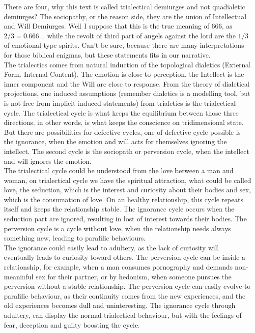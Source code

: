 \documentclass[12pt,a4paper]{article}
\begin{document}
There are four, why this text is called trialectical demiurges and not quadialetic demiurges? The sociopathy, or the reason side, they are the union of Intellectual and Will Demiurges. Well I suppose that this is the true meaning of $666$, as $2/3=0.666\dots$ while the revolt of third part of angels against the lord are the $1/3$ of emotional type spirits. Can't be sure, because there are many interpretations for those biblical enigmas, but these statements fits in our narrative.\\

The trialectics comes from natural induction of the topological dialetics (External Form, Internal Content). The emotion is close to perception, the Intellect is the inner component and the Will are close to response. From the theory of dialetical projections, one induced assumptions (remember dialetics is a modelling tool, but is not free from implicit induced statements) from trialetics is the trialectical cycle. The trialectical cycle is what keeps the equilibrium between those three directions, in other words, is what keeps the conscience on tridimensional state. But there are possibilities for defective cycles, one of defective cycle possible is the ignorance, when the emotion and will acts for themselves ignoring the intellect. The second cycle is the sociopath or perversion cycle, when the intellect and will ignores the emotion. \\

The trialectical cycle could be understood from the love between a man and woman, on trialectical cycle we have the spiritual attraction, what could be called love, the seduction, which is the interest and curiosity about their bodies and sex, which is the consumation of love. On an healthy relationship, this cycle repeats itself and keeps the relationship stable. The ignorance cycle occurs when the seduction part are ignored, resulting in lost of interest towards their bodies. The perversion cycle is a cycle without love, when the relationship needs always something new, leading to parafilic behaviours. \\

The ignorance could easily lead to adultery, as the lack of curiosity will eventually leads to curiosity toward others. The perversion cycle can be inside a relationship, for example, when a man consumes pornography and demands non-meaninful sex for their partner, or by hedonism, when someone pursues the perversion without a stable relationship. The perversion cycle can easily evolve to parafilic behaviour, as their continuity comes from the new experiences, and the old experiences becomes dull and uninteresting. The ignorance cycle through adultery, can display the normal trialectical behaviour, but with the feelings of fear, deception and guilty boosting the cycle. \\
\end{document}
